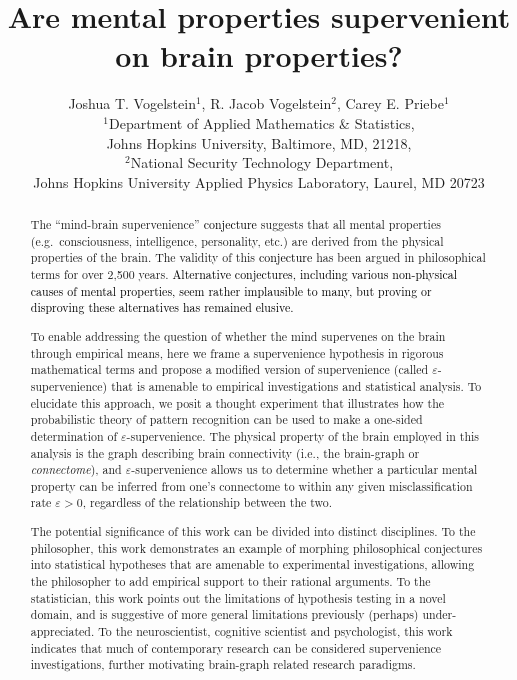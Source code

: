 \documentclass{article}
\title{Are mental properties supervenient on brain properties?}
\author{Joshua T. Vogelstein$^1$, R. Jacob Vogelstein$^2$, Carey E. Priebe$^1$\\
$^1$Department of Applied Mathematics \& Statistics, \\ Johns Hopkins University, Baltimore, MD, 21218,\\ $^2$National Security Technology Department, \\ Johns Hopkins University Applied Physics Laboratory, Laurel, MD 20723
}
\providecommand{\tr}[1]{\textcolor{black}{#1}}
\begin{document}
\maketitle
\begin{abstract}

The ``mind-brain supervenience'' \tr{conjecture} suggests that all mental properties (e.g.\ consciousness, intelligence, personality, etc.) are derived from the physical properties of the brain. The validity of this \tr{conjecture} has been argued in philosophical terms for over 2,500 years. \tr{Alternative conjectures, including various non-physical causes of mental properties, seem rather implausible to many, but proving or disproving these alternatives has remained elusive.}  


To enable addressing the question of whether the mind supervenes on the brain through empirical means, here we frame a supervenience hypothesis in rigorous mathematical terms and propose a modified version of supervenience (called $\varepsilon$-supervenience) that is amenable to empirical investigations and statistical analysis. To elucidate this approach, we posit a thought experiment that illustrates how the probabilistic theory of pattern recognition can be used to make a one-sided determination of $\varepsilon$-supervenience. The physical property of the brain employed in this analysis is the graph describing brain connectivity (i.e., the brain-graph or \emph{connectome}), and $\varepsilon$-supervenience allows us to determine whether a particular mental property can be inferred from one's connectome to within any given misclassification rate $\varepsilon > 0$, regardless of the relationship between the two. %

The potential significance of this work can be divided into distinct disciplines.  To the philosopher, this work demonstrates an example of morphing philosophical conjectures into statistical hypotheses that are amenable to experimental investigations, allowing the philosopher to add empirical support to their rational arguments.  To the statistician, this work points out the limitations of hypothesis testing in a novel domain, and is suggestive of more general limitations previously (perhaps) under-appreciated.   To the neuroscientist, cognitive scientist and psychologist, this work indicates that much of contemporary research can be considered supervenience investigations, further motivating brain-graph related research paradigms.



\end{abstract}
\end{document}
